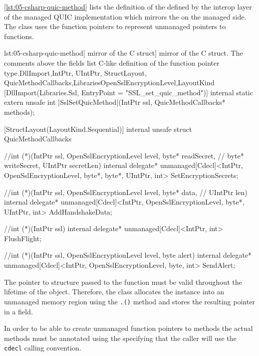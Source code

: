 \autoref{lst:05-csharp-quic-method} lists the definition of the  defined
by the interop layer of the managed QUIC implementation which mirrors the 
on the managed \dotnet{} side. The  class uses the \csharp{} function
pointers to represent unmanaged pointers to \csharp{} functions.

\begin{myListingCsharpNoPageBreak}{lst:05-csharp-quic-method}{[\csharp{} mirror of the  C struct]\csharp{} mirror of the  C struct. The comments above the fields list C-like definition of the function pointer type.}{DllImport,IntPtr, UIntPtr, StructLayout, QuicMethodCallbacks,Libraries}{OpenSslEncryptionLevel,LayoutKind}
[DllImport(Libraries.Ssl, EntryPoint = "SSL_set_quic_method")]
internal static extern unsafe int |SslSetQuicMethod|(IntPtr ssl,
    QuicMethodCallbacks* methods);

[StructLayout(LayoutKind.Sequential)]
internal unsafe struct QuicMethodCallbacks
{
    //int (*)(IntPtr ssl, OpenSslEncryptionLevel level, byte* readSecret,
    //        byte* writeSecret, UIntPtr secretLen)
    internal delegate* unmanaged[Cdecl]<IntPtr, OpenSslEncryptionLevel,
        byte*, byte*, UIntPtr, int> SetEncryptionSecrets;

    //int (*)(IntPtr ssl, OpenSslEncryptionLevel level, byte* data,
    //        UIntPtr len)
    internal delegate* unmanaged[Cdecl]<IntPtr, OpenSslEncryptionLevel,
        byte*, UIntPtr, int> AddHandshakeData;

    //int (*)(IntPtr ssl)
    internal delegate* unmanaged[Cdecl]<IntPtr, int> FlushFlight;

    //int (*)(IntPtr ssl, OpenSslEncryptionLevel level, byte alert)
    internal delegate* unmanaged[Cdecl]<IntPtr, OpenSslEncryptionLevel, byte,
        int> SendAlert;
}
\end{myListingCsharpNoPageBreak}

The pointer to  structure passed to the 
function must be valid throughout the lifetime of the \SSLCTX{} object. Therefore, the \OpenSslTls{}
class allocates the  instance into an unmanaged memory region using the
\texttt{.()} method and stores the resulting pointer in a
 field.

In order to be able to create unmanaged function pointers to \csharp{} methods the actual methods
must be annotated using the  specifying that the caller will
use the \texttt{cdecl} calling convention.

